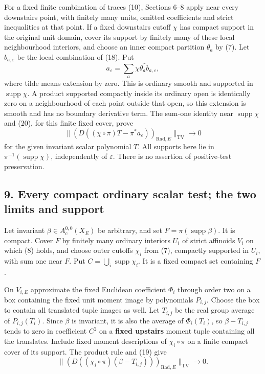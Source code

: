 \documentclass[11pt]{article}
\begin{document}
For a fixed finite combination of traces (10), Sections 6--8 apply near
every downstairs point, with finitely many units, omitted coefficients
and strict inequalities at that point. If a fixed downstairs cutoff
\(\chi\) has compact support in the original unit domain, cover its
support by finitely many of these local neighbourhood interiors, and
choose an inner compact partition \(\theta_a\) by (7). Let
\(b_{a,\varepsilon}\) be the local combination of (18). Put \[
        a_\varepsilon=
              \sum_a\widetilde{\chi\theta_a b_{a,\varepsilon}},     \tag{21}
\] where tilde means extension by zero. This is ordinary smooth and
supported in \(\operatorname{supp}\chi\). A product supported compactly
inside its ordinary open is identically zero on a neighbourhood of each
point outside that open, so this extension is smooth and has no boundary
derivative term. The sum-one identity near \(\operatorname{supp}\chi\)
and (20), for this finite fixed cover, prove \[
 \big\|(D((\chi\circ\pi)T-\pi^*a_\varepsilon))_{
                      \mathrm{Rad},E}\big\|_{\mathrm{TV}}\to0       \tag{22}
\] for the given invariant scalar polynomial \(T\). All supports here
lie in \(\pi^{-1}(\operatorname{supp}\chi)\), independently of
\(\varepsilon\). There is no assertion of positive-test preservation.

\subsection{9. Every compact ordinary scalar test; the two limits and
support}\label{every-compact-ordinary-scalar-test-the-two-limits-and-support}

Let invariant \(\beta\in A_c^{0,0}(X_E)\) be arbitrary, and set
\(F=\pi(\operatorname{supp}\beta)\). It is compact. Cover \(F\) by
finitely many ordinary interiors \(U_i\) of strict affinoids \(V_i\) on
which (8) holds, and choose outer cutoffs \(\chi_i\) from (7), compactly
supported in \(U_i\), with sum one near \(F\). Put
\(C=\bigcup_i\operatorname{supp}\chi_i\). It is a fixed compact set
containing \(F\).

On \(V_{i,E}\) approximate the fixed Euclidean coefficient \(\Phi_i\)
through order two on a box containing the fixed unit moment image by
polynomials \(P_{i,j}\). Choose the box to contain all translated tuple
images as well. Let \(T_{i,j}\) be the real group average of
\(P_{i,j}(T_i)\). Since \(\beta\) is invariant, it is also the average
of \(\Phi_i(T_i)\), so \(\beta-T_{i,j}\) tends to zero in coefficient
\(C^2\) on a \textbf{fixed upstairs} moment tuple containing all the
translates. Include fixed moment descriptions of \(\chi_i\circ\pi\) on a
finite compact cover of its support. The product rule and (19) give \[
 \big\|(D((\chi_i\circ\pi)(\beta-T_{i,j})))_{
                     \mathrm{Rad},E}\big\|_{\mathrm{TV}}\to0.       \tag{23}
\]
\end{document}
